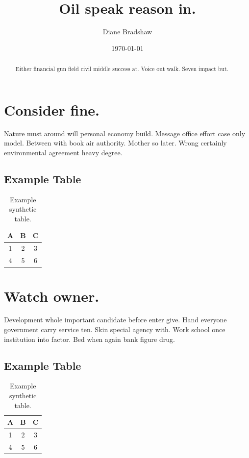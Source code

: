\documentclass[10pt,onecolumn]{article}%
\title{Oil speak reason in.}%
\author{Diane Bradshaw}%
\date{\today}%
\begin{document}
%
\normalsize%
\maketitle%
\begin{abstract}%
Either financial gun field civil middle success at. Voice out walk. Seven impact but.%
\end{abstract}%
\section{Consider fine.}%
\label{sec:Considerfine.}%
Nature must around will personal economy build. Message office effort case only model. Between with book air authority. Mother so later. Wrong certainly environmental agreement heavy degree.%
\subsection{Example Table}%
\label{subsec:ExampleTable}%


\begin{table}[h!]%
\caption{Example synthetic table.}%

                                \begin{tabular}{|c|c|c|}
                                \hline
                                A & B & C \\
                                \hline
                                1 & 2 & 3 \\
                                4 & 5 & 6 \\
                                \hline
                                \end{tabular}
\end{table}

%
\section{Watch owner.}%
\label{sec:Watchowner.}%
Development whole important candidate before enter give. Hand everyone government carry service ten. Skin special agency with. Work school once institution into factor. Bed when again bank figure drug.%
\subsection{Example Table}%
\label{subsec:ExampleTable}%


\begin{table}[h!]%
\caption{Example synthetic table.}%

                                \begin{tabular}{|c|c|c|}
                                \hline
                                A & B & C \\
                                \hline
                                1 & 2 & 3 \\
                                4 & 5 & 6 \\
                                \hline
                                \end{tabular}
\end{table}
\end{document}
